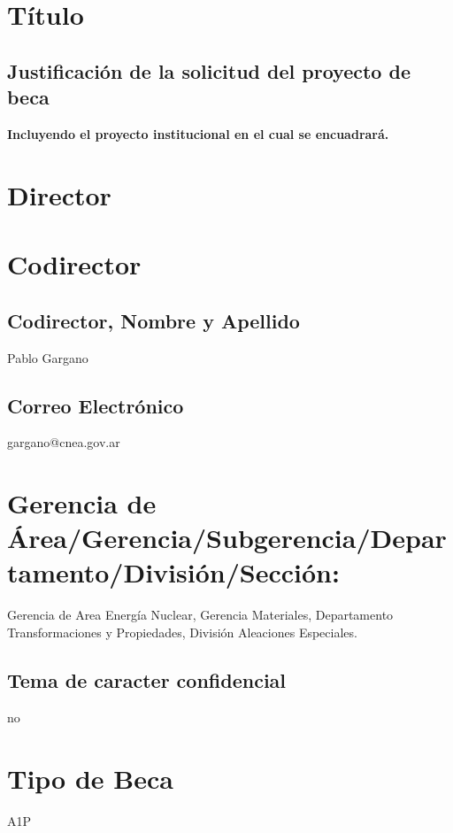 
\section{Título}

\subsection{ Justificación de la solicitud del proyecto de beca }
\textbf{Incluyendo el proyecto institucional en el cual se encuadrará.}

 

\section{Director}

\section{Codirector}

\subsection{Codirector, Nombre y Apellido}

Pablo Gargano

\subsection{Correo Electrónico}

gargano@cnea.gov.ar

\section{Gerencia de Área/Gerencia/Subgerencia/Departamento/División/Sección:}

Gerencia de Area Energía Nuclear, Gerencia Materiales, Departamento
Transformaciones y Propiedades, División Aleaciones Especiales. 

\subsection{Tema de caracter confidencial}

no

\section{Tipo de Beca}
A1P

